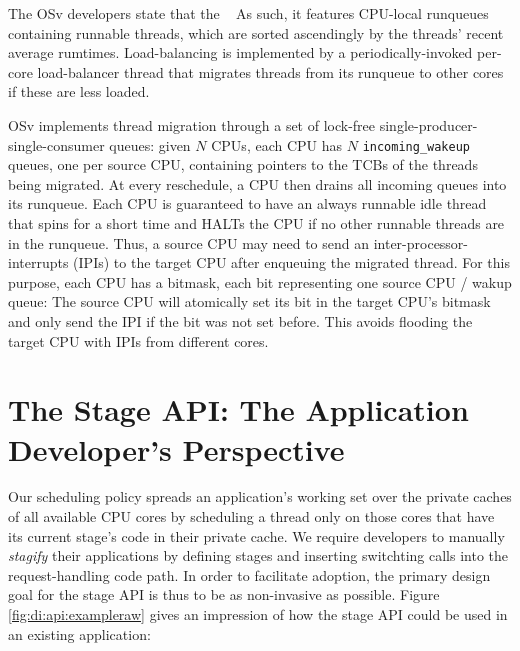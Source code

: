 \documentclass[12pt,a4paper]{book}
\begin{document}
The OSv developers state that the ~\cite{osvMain}
As such, it features CPU-local runqueues containing runnable threads, which are sorted ascendingly by the threads' recent average rumtimes.
Load-balancing is implemented by a periodically-invoked per-core load-balancer thread that migrates threads from its runqueue to other cores if these are less loaded.

OSv implements thread migration through a set of lock-free single-producer-single-consumer queues:
given $N$ CPUs, each CPU has $N$ \texttt{incoming\_wakeup} queues, one per source CPU, containing pointers to the TCBs of the threads being migrated.
At every reschedule, a CPU then drains all incoming queues into its runqueue.
Each CPU is guaranteed to have an always runnable idle thread that spins for a short time and HALTs the CPU if no other runnable threads are in the runqueue.
Thus, a source CPU may need to send an inter-processor-interrupts (IPIs) to the target CPU after enqueuing the migrated thread.
For this purpose, each CPU has a bitmask, each bit representing one source CPU / wakup queue:
The source CPU will atomically set its bit in the target CPU's bitmask and only send the IPI if the bit was not set before.
This avoids flooding the target CPU with IPIs from different cores.



\section{The Stage API: The Application Developer's Perspective}\label{ch:di:api}
Our scheduling policy spreads an application's working set over the private caches of all available CPU cores by scheduling a thread only on those cores that have its current stage's code in their private cache.
We require developers to manually \emph{stagify} their applications by defining stages and inserting switchting calls into the request-handling code path.
In order to facilitate adoption, the primary design goal for the stage API is thus to be as non-invasive as possible.
Figure \ref{fig:di:api:exampleraw} gives an impression of how the stage API could be used in an existing application:
\end{document}
